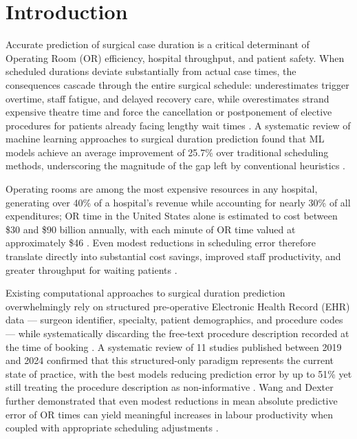 \documentclass[3p]{elsarticle}
\begin{document}
\section{Introduction}\label{sec:introduction}
Accurate prediction of surgical case duration is a critical determinant of Operating Room (OR) efficiency, hospital throughput, and patient safety. When scheduled durations deviate substantially from actual case times, the consequences cascade through the entire surgical schedule: underestimates trigger overtime, staff fatigue, and delayed recovery care, while overestimates strand expensive theatre time and force the cancellation or postponement of elective procedures for patients already facing lengthy wait times \cite{oliveira2023systematic,park2025machine}. A systematic review of machine learning approaches to surgical duration prediction found that ML models achieve an average improvement of 25.7\% over traditional scheduling methods, underscoring the magnitude of the gap left by conventional heuristics \cite{park2025machine}.

Operating rooms are among the most expensive resources in any hospital, generating over 40\% of a hospital's revenue while accounting for nearly 30\% of all expenditures; OR time in the United States alone is estimated to cost between \$30 and \$90 billion annually, with each minute of OR time valued at approximately \$46 \cite{al2025comprehensive,park2025machine}. Even modest reductions in scheduling error therefore translate directly into substantial cost savings, improved staff productivity, and greater throughput for waiting patients \cite{wang2022more}.

Existing computational approaches to surgical duration prediction overwhelmingly rely on structured pre-operative Electronic Health Record (EHR) data — surgeon identifier, specialty, patient demographics, and procedure codes — while systematically discarding the free-text procedure description recorded at the time of booking \cite{kwong2025optimizing,park2025machine}. A systematic review of 11 studies published between 2019 and 2024 confirmed that this structured-only paradigm represents the current state of practice, with the best models reducing prediction error by up to 51\% yet still treating the procedure description as non-informative \cite{park2025machine}. Wang and Dexter further demonstrated that even modest reductions in mean absolute predictive error of OR times can yield meaningful increases in labour productivity when coupled with appropriate scheduling adjustments \cite{wang2022more}.
\end{document}
